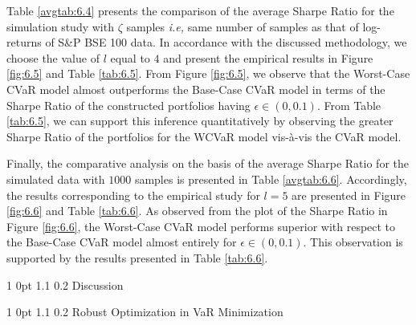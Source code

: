 \documentclass[12pt]{article}
\makeatletter
\numberwithin{equation}{section}
\renewcommand{\section}{
  \@startsection
  {section}%
  {1}%
  {0pt}%
  {1.1\baselineskip}%
  {0.2\baselineskip}%
  {\sc \centering}%
}
\renewcommand{\subsection}{
  \@startsection
  {subsection}%
  {1}%
  {0pt}%
  {1.1\baselineskip}%
  {0.2\baselineskip}%
  {\sc \centering}%
}
\makeatother
\begin{document}
Table \ref{avgtab:6.4} presents the comparison of the average Sharpe Ratio for the simulation study with $\zeta$ samples \textit{i.e,} same number of samples as that of log-returns of S\&P BSE 100 data. In accordance with the discussed methodology, we choose the value of $l$ equal to $4$ and present the empirical results in Figure \ref{fig:6.5} and Table \ref{tab:6.5}. From Figure \ref{fig:6.5}, we observe that the Worst-Case CVaR model almost outperforms the Base-Case CVaR model in terms of the Sharpe Ratio of the constructed portfolios having $\epsilon \in (0,0.1)$. From Table \ref{tab:6.5}, we can support this inference quantitatively by observing the greater Sharpe Ratio of the portfolios for the WCVaR model vis-\`a-vis the CVaR model. 

Finally, the comparative analysis on the basis of the average Sharpe Ratio for the simulated data with $1000$ samples is presented in Table \ref{avgtab:6.6}. Accordingly, the results corresponding to the empirical study for $l=5$ are presented in Figure \ref{fig:6.6} and Table \ref{tab:6.6}. As observed from the plot of the Sharpe Ratio in Figure \ref{fig:6.6}, the Worst-Case CVaR model performs superior with respect to the Base-Case CVaR model almost entirely for $\epsilon \in (0,0.1)$. This observation is supported by the results presented in Table \ref{tab:6.6}.



\section{Discussion}
\label{Discussion}

\subsection{Robust Optimization in VaR Minimization}
\end{document}
